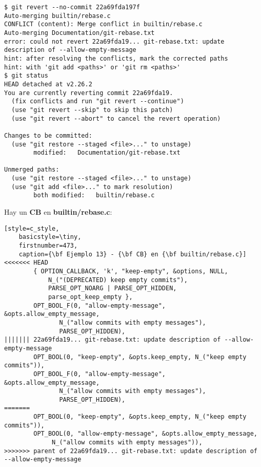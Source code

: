 \begin{lstlisting}[style=console_style,
	basicstyle=\tiny,
	caption={\bf Ejemplo 13} - Revirtiendo]
$ git revert --no-commit 22a69fda197f
Auto-merging builtin/rebase.c
CONFLICT (content): Merge conflict in builtin/rebase.c
Auto-merging Documentation/git-rebase.txt
error: could not revert 22a69fda19... git-rebase.txt: update description of --allow-empty-message
hint: after resolving the conflicts, mark the corrected paths
hint: with 'git add <paths>' or 'git rm <paths>'
$ git status
HEAD detached at v2.26.2
You are currently reverting commit 22a69fda19.
  (fix conflicts and run "git revert --continue")
  (use "git revert --skip" to skip this patch)
  (use "git revert --abort" to cancel the revert operation)

Changes to be committed:
  (use "git restore --staged <file>..." to unstage)
        modified:   Documentation/git-rebase.txt

Unmerged paths:
  (use "git restore --staged <file>..." to unstage)
  (use "git add <file>..." to mark resolution)
        both modified:   builtin/rebase.c
\end{lstlisting}

Hay un {\bf CB} en {\bf builtin/rebase.c}:
\begin{lstlisting}[style=c_style,
	basicstyle=\tiny,
	firstnumber=473,
	caption={\bf Ejemplo 13} - {\bf CB} en {\bf builtin/rebase.c}]
<<<<<<< HEAD
		{ OPTION_CALLBACK, 'k', "keep-empty", &options, NULL,
			N_("(DEPRECATED) keep empty commits"),
			PARSE_OPT_NOARG | PARSE_OPT_HIDDEN,
			parse_opt_keep_empty },
		OPT_BOOL_F(0, "allow-empty-message", &opts.allow_empty_message,
			   N_("allow commits with empty messages"),
			   PARSE_OPT_HIDDEN),
||||||| 22a69fda19... git-rebase.txt: update description of --allow-empty-message
		OPT_BOOL(0, "keep-empty", &opts.keep_empty, N_("keep empty commits")),
		OPT_BOOL_F(0, "allow-empty-message", &opts.allow_empty_message,
			   N_("allow commits with empty messages"),
			   PARSE_OPT_HIDDEN),
=======
		OPT_BOOL(0, "keep-empty", &opts.keep_empty, N_("keep empty commits")),
		OPT_BOOL(0, "allow-empty-message", &opts.allow_empty_message,
			 N_("allow commits with empty messages")),
>>>>>>> parent of 22a69fda19... git-rebase.txt: update description of --allow-empty-message
\end{lstlisting}

